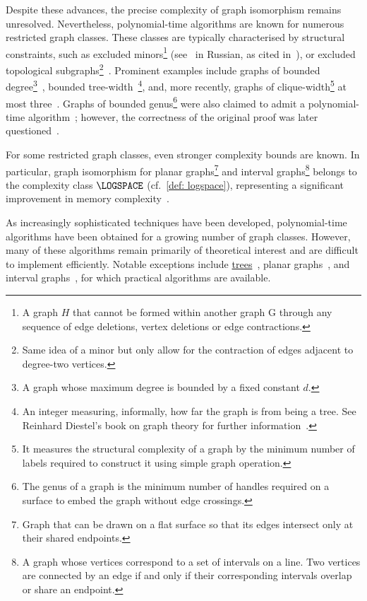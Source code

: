 Despite these advances, the precise complexity of graph isomorphism remains unresolved. Nevertheless, polynomial-time algorithms are known for numerous restricted graph classes. These classes are typically characterised by structural constraints, such as excluded minors\footnote{A graph $H$ that cannot be formed within another graph G through any sequence of edge deletions, vertex deletions or edge contractions.} (see~\cite{ponomarenko1988isomorphism} in Russian, as cited in~\cite{mckay2014practical}), or excluded topological subgraphs\footnote{Same idea of a minor but only allow for the contraction of edges adjacent to degree-two vertices.}~\cite{grohe2012structural}. Prominent examples include graphs of bounded degree\footnote{A graph whose maximum degree is bounded by a fixed constant $d$.}~\cite{luks1982isomorphism}, bounded tree-width~\cite{bodlaender1990polynomial}\footnote{An integer measuring, informally, how far the graph is from being a tree. See Reinhard Diestel’s book on graph theory for further information~\cite{diestel2025}.}, and, more recently, graphs of clique-width\footnote{It measures the structural complexity of a graph by the minimum number of labels required to construct it using simple graph operation.} at most three~\cite{das2020polynomial}. Graphs of bounded genus\footnote{The genus of a graph is the minimum number of handles required on a surface to embed the graph without edge crossings.} were also claimed to admit a polynomial-time algorithm~\cite{filotti1980polynomial}; however, the correctness of the original proof was later questioned~\cite{myrvold2011errors}.

For some restricted graph classes, even stronger complexity bounds are known. In particular, graph isomorphism for planar graphs\footnote{ Graph that can be drawn on a flat surface so that its edges intersect only at their shared endpoints.} and interval graphs\footnote{A graph whose vertices correspond to a set of intervals on a line. Two vertices are connected by an edge if and only if their corresponding intervals overlap or share an endpoint.} belongs to the complexity class $\LOGSPACE$ (cf.~\cref{def: logspace}), representing a significant improvement in memory complexity~\cite{datta2009planar, kobler2011interval}.

As increasingly sophisticated techniques have been developed, polynomial-time algorithms have been obtained for a growing number of graph classes. However, many of these algorithms remain primarily of theoretical interest and are difficult to implement efficiently. Notable exceptions include \hyperref[def:tree]{trees}~\cite{aho1974design}, planar graphs~\cite{10.1145/800119.803896}, and interval graphs~\cite{colbourn1981linear}, for which practical algorithms are available.


